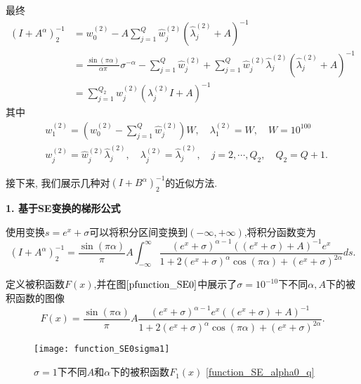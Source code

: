 最终
\begin{equation}\label{key}
	\begin{aligned}
		(I+A^{\alpha})^{-1}_2&=w_0^{(2)}-
		A\sum_{j=1}^Q \hat{w}^{(2)}_j(\hat{\lambda}^{(2)}_j+A)^{-1}\\
		&=\frac{\sin(\pi \alpha)}{\alpha\pi}\sigma^{-\alpha}-
		\sum_{j=1}^Q \hat{w}^{(2)}_j+\sum_{j=1}^Q \hat{w}^{(2)}_j\hat{\lambda}^{(2)}_j(\hat{\lambda}^{(2)}_j+A)^{-1}\\
		&=\sum_{j=1}^{Q_2}w^{(2)}_j(\lambda^{(2)}_jI+A)^{-1}
	\end{aligned}
\end{equation}
其中
\begin{equation}\label{key}
	\begin{aligned}
		&w_1^{(2)}=	\left(w_0^{(2)}-
		\sum_{j=1}^Q \hat{w}^{(2)}_j\right)W,\quad
		\lambda_1^{(2)}=W,\quad W=10^{100}\\
		&w_j^{(2)}=\hat{w}^{(2)}_j\hat{\lambda}^{(2)}_j,\quad\lambda_j^{(2)}=\hat{\lambda}^{(2)}_j,\quad j=2,\dotsb,Q_2,\quad Q_2=Q+1.
	\end{aligned}
\end{equation}

接下来, 我们展示几种对\((I+B^{\alpha})^{-1}_2\)的近似方法. 



\textbf{1. 基于SE变换的梯形公式}

使用变换\(s=e^{x}+\sigma\)可以将积分区间变换到\((-\infty,+\infty)\),将积分函数变为
\begin{equation}\label{function_SE0}
	(I+A^{\alpha})^{-1}_2=\frac{\sin(\pi\alpha)}{\pi}A\int_{-\infty}^{\infty}\frac{(e^{ x}+\sigma)^{\alpha-1}((e^{ x}+\sigma)+{A})^{-1} e^{ x}}{1+2(e^{x}+\sigma)^{\alpha}\cos(\pi\alpha)+(e^{ x}+\sigma)^{2\alpha}}ds.
\end{equation}

定义被积函数\(F(x)\),并在图$\ref{pfunction_SE0}$中展示了\(\sigma=10^{-10}\)下不同\(\alpha,A\)下的被积函数的图像
\begin{equation}
	F(x)=\frac{\sin(\pi\alpha)}{\pi}A\frac{(e^{ x}+\sigma)^{\alpha-1} e^{ x}((e^{ x}+\sigma)+{A})^{-1}}{1+2(e^{ x}+\sigma)^{\alpha}\cos(\pi\alpha)+(e^{ x}+\sigma)^{2\alpha}}.
	\label{function_SE_alpha0_q}
\end{equation}

\begin{figure}[htbp]
	\centering
	\texttt{[image: function\_SE0sigma1]}
	\caption{\(\sigma=1\)下不同$A$和$\alpha$下的被积函数$F_1(x)$ \eqref{function_SE_alpha0_q}}
	\label{pfunction_SE0}
\end{figure}

